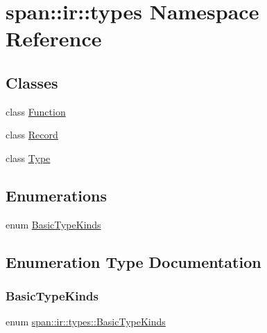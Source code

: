 \hypertarget{namespacespan_1_1ir_1_1types}{}\section{span\+:\+:ir\+:\+:types Namespace Reference}
\label{namespacespan_1_1ir_1_1types}
\subsection*{Classes}
\begin{DoxyCompactItemize}
\item 
class \hyperlink{classspan_1_1ir_1_1types_1_1Function}{Function}
\item 
class \hyperlink{classspan_1_1ir_1_1types_1_1Record}{Record}
\item 
class \hyperlink{classspan_1_1ir_1_1types_1_1Type}{Type}
\end{DoxyCompactItemize}
\subsection*{Enumerations}
\begin{DoxyCompactItemize}
\item 
enum \hyperlink{namespacespan_1_1ir_1_1types_a12599995a12fb984883f13a64936de36}{Basic\+Type\+Kinds} 
\end{DoxyCompactItemize}


\subsection{Enumeration Type Documentation}
\mbox{\label{namespacespan_1_1ir_1_1types_a12599995a12fb984883f13a64936de36}} 
\subsubsection{\texorpdfstring{Basic\+Type\+Kinds}{BasicTypeKinds}}
{\footnotesize\ttfamily enum \hyperlink{namespacespan_1_1ir_1_1types_a12599995a12fb984883f13a64936de36}{span\+::ir\+::types\+::\+Basic\+Type\+Kinds}}

